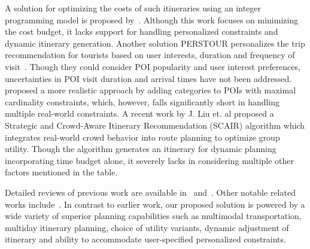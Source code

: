 A solution for optimizing the costs of such itineraries using an integer programming model is proposed by~\citep{rambha2024optimized}. Although this work focuses on minimizing the cost budget, it lacks support for handling personalized constraints and dynamic itinerary generation. Another solution PERSTOUR personalizes the trip recommendation for tourists based on user interests, duration and frequency of visit~\citep{lim2018personalized}. Though they could consider POI popularity and user interest preferences, uncertainties in POI visit duration and arrival times have not been addressed. \citep{bolzoni2014efficient} proposed a more realistic approach by adding categories to POIs with maximal cardinality constraints, which, however, falls significantly short in handling multiple real-world constraints. A recent work by J. Liu et. al \citep{liu2025optimizing} proposed a Strategic and Crowd-Aware Itinerary Recommendation
(SCAIR) algorithm which integrates real-world crowd behavior into route planning to optimize group utility. Though the algorithm generates an itinerary for dynamic planning incorporating time budget alone, it severely lacks in considering multiple other factors mentioned in the table. 

Detailed reviews of previous work are available in~\citep{gavalas2014survey} and~\citep{sylejmani2011survey}.
Other notable related works include~\citep{zheng2021novel,yu2017mining,jiaoman2018travel,sylejmani2017planning,zografos2008algorithms,rani2018development,yu2014optimal,arora2024itinerary}. In contrast to earlier work, our proposed \trip solution is powered by a wide variety of superior planning capabilities such as multimodal transportation, multiday itinerary planning, choice of utility variants, dynamic adjustment of itinerary and ability to accommodate user-specified personalized constraints.

